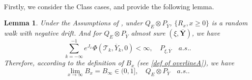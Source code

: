 \documentclass[]{article}
\numberwithin{equation}{section}
\theoremstyle{thmstyleone}%
\theoremstyle{thmstyletwo}%
\theoremstyle{thmstylethree}%
\theoremstyle{thmstylefour}%
\newtheorem{lemma}{Lemma}
\theoremstyle{thmstylefive}%
\theoremstyle{thmstylesix}%
\begin{document}
	
	\
	
	Firstly, we consider the Class  cases, and provide the following lemma.
	\begin{lemma}\label{Lemma of Strongly}
		Under the Assumptions of , under $Q_E\otimes P_{\overline{Y}}$, $\{R_x,x\geqslant0\}$ is a random walk with negative drift.
		And for $Q_E\otimes P_{\overline{Y}}$ almost sure $(\xi,\overline{\textbf{Y}})$, we have
		\begin{equation*} \sum_{k=-\infty}^{-1}e^{J_x}\Phi(\mathcal{T}_k,\overline{Y}_k,0) <\infty, \quad P_{\xi,\overline{Y}} \quad  a.s..
		\end{equation*}
		Therefore, according to the definition of $B_x$ (see \cref{def of overlineA}), we have
		\begin{equation*}
			\lim\limits_{x\rightarrow\infty}B_x =B_\infty \in (0,1],\quad Q_E\otimes P_{\overline{Y}}\quad a.s..
		\end{equation*}
	\end{lemma}
	
\end{document}
